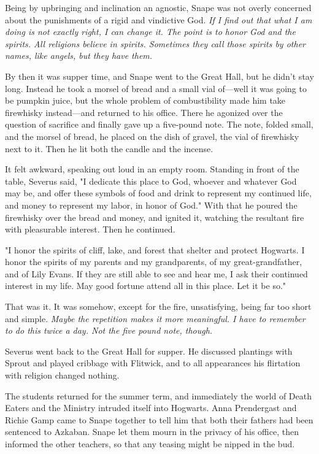 Being by upbringing and inclination an agnostic, Snape was not overly concerned about the punishments of a rigid and vindictive God. \emph{If I find out that what I am doing is not exactly right, I can change it. The point is to honor God and the spirits. All religions believe in spirits. Sometimes they call those spirits by other names, like angels, but they have them.}

By then it was supper time, and Snape went to the Great Hall, but he didn't stay long. Instead he took a morsel of bread and a small vial of—well it was going to be pumpkin juice, but the whole problem of combustibility made him take firewhisky instead—and returned to his office. There he agonized over the question of sacrifice and finally gave up a five-pound note. The note, folded small, and the morsel of bread, he placed on the dish of gravel, the vial of firewhisky next to it. Then he lit both the candle and the incense.

It felt awkward, speaking out loud in an empty room. Standing in front of the table, Severus said, "I dedicate this place to God, whoever and whatever God may be, and offer these symbols of food and drink to represent my continued life, and money to represent my labor, in honor of God." With that he poured the firewhisky over the bread and money, and ignited it, watching the resultant fire with pleasurable interest. Then he continued.

"I honor the spirits of cliff, lake, and forest that shelter and protect Hogwarts. I honor the spirits of my parents and my grandparents, of my great-grandfather, and of Lily Evans. If they are still able to see and hear me, I ask their continued interest in my life. May good fortune attend all in this place. Let it be so."

That was it. It was somehow, except for the fire, unsatisfying, being far too short and simple. \emph{Maybe the repetition makes it more meaningful. I have to remember to do this twice a day. Not the five pound note, though.}

Severus went back to the Great Hall for supper. He discussed plantings with Sprout and played cribbage with Flitwick, and to all appearances his flirtation with religion changed nothing.

The students returned for the summer term, and immediately the world of Death Eaters and the Ministry intruded itself into Hogwarts. Anna Prendergast and Richie Gamp came to Snape together to tell him that both their fathers had been sentenced to Azkaban. Snape let them mourn in the privacy of his office, then informed the other teachers, so that any teasing might be nipped in the bud.

